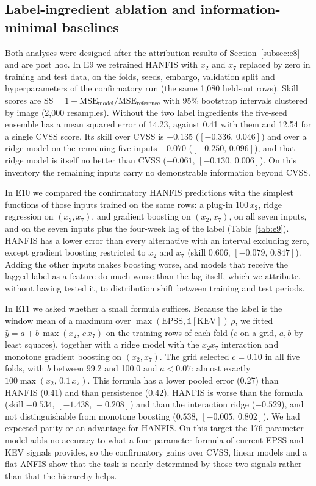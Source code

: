 \documentclass[referee,lineno,pdflatex,sn-basic]{sn-jnl}%
\theoremstyle{thmstyleone}%
\theoremstyle{thmstyletwo}%
\theoremstyle{thmstylethree}%
\begin{document}
\subsection{Label-ingredient ablation and information-minimal baselines}\label{subsec:e9}
Both analyses were designed after the attribution results of Section~\ref{subsec:e8} and are post hoc. In E9 we retrained HANFIS with $x_2$ and $x_7$ replaced by zero in training and test data, on the folds, seeds, embargo, validation split and hyperparameters of the confirmatory run (the same 1{,}080 held-out rows). Skill scores are $\mathrm{SS}=1-\mathrm{MSE}_{\mathrm{model}}/\mathrm{MSE}_{\mathrm{reference}}$ with 95\% bootstrap intervals clustered by image (2{,}000 resamples). Without the two label ingredients the five-seed ensemble has a mean squared error of 14.23, against 0.41 with them and 12.54 for a single CVSS score. Its skill over CVSS is $-0.135$ ($[-0.336,\,0.046]$) and over a ridge model on the remaining five inputs $-0.070$ ($[-0.250,\,0.096]$), and that ridge model is itself no better than CVSS ($-0.061$, $[-0.130,\,0.006]$). On this inventory the remaining inputs carry no demonstrable information beyond CVSS.

In E10 we compared the confirmatory HANFIS predictions with the simplest functions of those inputs trained on the same rows: a plug-in $100\,x_2$, ridge regression on $(x_2,x_7)$, and gradient boosting on $(x_2,x_7)$, on all seven inputs, and on the seven inputs plus the four-week lag of the label (Table~\ref{tab:e9}). HANFIS has a lower error than every alternative with an interval excluding zero, except gradient boosting restricted to $x_2$ and $x_7$ (skill $0.606$, $[-0.079,\,0.847]$). Adding the other inputs makes boosting worse, and models that receive the lagged label as a feature do much worse than the lag itself, which we attribute, without having tested it, to distribution shift between training and test periods.

In E11 we asked whether a small formula suffices. Because the label is the window mean of a maximum over $\max(\mathrm{EPSS},\mathbb{1}[\mathrm{KEV}])\,\rho$, we fitted $\hat y=a+b\,\max(x_2,\,c\,x_7)$ on the training rows of each fold ($c$ on a grid, $a,b$ by least squares), together with a ridge model with the $x_2x_7$ interaction and monotone gradient boosting on $(x_2,x_7)$. The grid selected $c=0.10$ in all five folds, with $b$ between 99.2 and 100.0 and $a<0.07$: almost exactly $100\max(x_2,\,0.1\,x_7)$. This formula has a lower pooled error (0.27) than HANFIS (0.41) and than persistence (0.42). HANFIS is worse than the formula (skill $-0.534$, $[-1.438,\,-0.208]$) and than the interaction ridge ($-0.529$), and not distinguishable from monotone boosting ($0.538$, $[-0.005,\,0.802]$). We had expected parity or an advantage for HANFIS. On this target the 176-parameter model adds no accuracy to what a four-parameter formula of current EPSS and KEV signals provides, so the confirmatory gains over CVSS, linear models and a flat ANFIS show that the task is nearly determined by those two signals rather than that the hierarchy helps.
\end{document}

